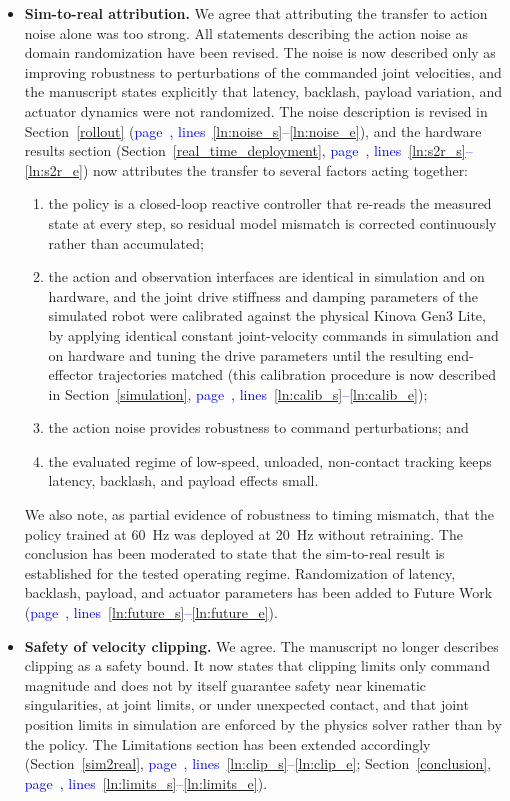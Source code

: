 \documentclass[11pt]{elsarticle}
\newcommand{\mlines}[2]{\textcolor{blue}{page~\pageref{#1}, lines~\ref{#1}--\ref{#2}}}
\begin{document}
\begin{responsebox}
\begin{itemize}
  \item \textbf{Sim-to-real attribution.} We agree that attributing the transfer to action noise alone was too strong. All statements describing the action noise as domain randomization have been revised. The noise is now described only as improving robustness to perturbations of the commanded joint velocities, and the manuscript states explicitly that latency, backlash, payload variation, and actuator dynamics were not randomized. The noise description is revised in Section~\ref{rollout} (\mlines{ln:noise_s}{ln:noise_e}), and the hardware results section (Section~\ref{real_time_deployment}, \mlines{ln:s2r_s}{ln:s2r_e}) now attributes the transfer to several factors acting together:
  \begin{enumerate}[label=(\roman*)]
    \item the policy is a closed-loop reactive controller that re-reads the measured state at every step, so residual model mismatch is corrected continuously rather than accumulated;
    \item the action and observation interfaces are identical in simulation and on hardware, and the joint drive stiffness and damping parameters of the simulated robot were calibrated against the physical Kinova Gen3 Lite, by applying identical constant joint-velocity commands in simulation and on hardware and tuning the drive parameters until the resulting end-effector trajectories matched (this calibration procedure is now described in Section~\ref{simulation}, \mlines{ln:calib_s}{ln:calib_e});
    \item the action noise provides robustness to command perturbations; and
    \item the evaluated regime of low-speed, unloaded, non-contact tracking keeps latency, backlash, and payload effects small.
  \end{enumerate}
  We also note, as partial evidence of robustness to timing mismatch, that the policy trained at 60~Hz was deployed at 20~Hz without retraining. The conclusion has been moderated to state that the sim-to-real result is established for the tested operating regime. Randomization of latency, backlash, payload, and actuator parameters has been added to Future Work (\mlines{ln:future_s}{ln:future_e}).

  \item \textbf{Safety of velocity clipping.} We agree. The manuscript no longer describes clipping as a safety bound. It now states that clipping limits only command magnitude and does not by itself guarantee safety near kinematic singularities, at joint limits, or under unexpected contact, and that joint position limits in simulation are enforced by the physics solver rather than by the policy. The Limitations section has been extended accordingly (Section~\ref{sim2real}, \mlines{ln:clip_s}{ln:clip_e}; Section~\ref{conclusion}, \mlines{ln:limits_s}{ln:limits_e}).


\end{itemize}
\end{responsebox}
\end{document}
